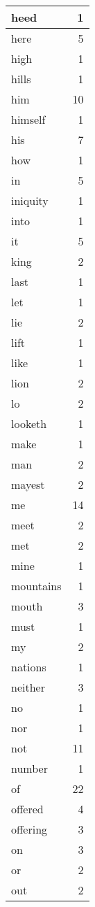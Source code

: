 \begin{center}
\begin{longtable}{l|r}
heed & 1\\ \hline 
here & 5\\ \hline 
high & 1\\ \hline 
hills & 1\\ \hline 
him & 10\\ \hline 
himself & 1\\ \hline 
his & 7\\ \hline 
how & 1\\ \hline 
in & 5\\ \hline 
iniquity & 1\\ \hline 
into & 1\\ \hline 
it & 5\\ \hline 
king & 2\\ \hline 
last & 1\\ \hline 
let & 1\\ \hline 
lie & 2\\ \hline 
lift & 1\\ \hline 
like & 1\\ \hline 
lion & 2\\ \hline 
lo & 2\\ \hline 
looketh & 1\\ \hline 
make & 1\\ \hline 
man & 2\\ \hline 
mayest & 2\\ \hline 
me & 14\\ \hline 
meet & 2\\ \hline 
met & 2\\ \hline 
mine & 1\\ \hline 
mountains & 1\\ \hline 
mouth & 3\\ \hline 
must & 1\\ \hline 
my & 2\\ \hline 
nations & 1\\ \hline 
neither & 3\\ \hline 
no & 1\\ \hline 
nor & 1\\ \hline 
not & 11\\ \hline 
number & 1\\ \hline 
of & 22\\ \hline 
offered & 4\\ \hline 
offering & 3\\ \hline 
on & 3\\ \hline 
or & 2\\ \hline 
out & 2\\ \hline 

\end{longtable}
\end{center}
